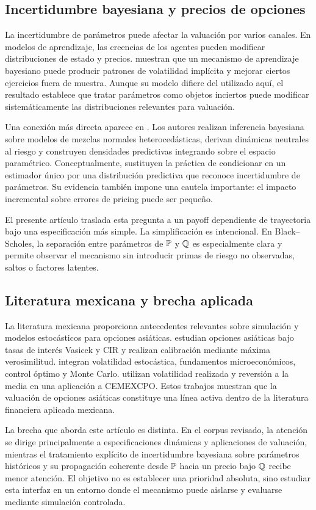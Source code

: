 \subsection{Incertidumbre bayesiana y precios de opciones}

La incertidumbre de parámetros puede afectar la valuación por varios canales. En modelos de aprendizaje, las creencias de los agentes pueden modificar distribuciones de estado y precios. \citet{guidolin2003} muestran que un mecanismo de aprendizaje bayesiano puede producir patrones de volatilidad implícita y mejorar ciertos ejercicios fuera de muestra. Aunque su modelo difiere del utilizado aquí, el resultado establece que tratar parámetros como objetos inciertos puede modificar sistemáticamente las distribuciones relevantes para valuación.

Una conexión más directa aparece en \citet{romboutsstentoft2014}. Los autores realizan inferencia bayesiana sobre modelos de mezclas normales heterocedásticas, derivan dinámicas neutrales al riesgo y construyen densidades predictivas integrando sobre el espacio paramétrico. Conceptualmente, sustituyen la práctica de condicionar en un estimador único por una distribución predictiva que reconoce incertidumbre de parámetros. Su evidencia también impone una cautela importante: el impacto incremental sobre errores de pricing puede ser pequeño.

El presente artículo traslada esta pregunta a un payoff dependiente de trayectoria bajo una especificación más simple. La simplificación es intencional. En Black--Scholes, la separación entre parámetros de $\mathbb{P}$ y $\mathbb{Q}$ es especialmente clara y permite observar el mecanismo sin introducir primas de riesgo no observadas, saltos o factores latentes.

\subsection{Literatura mexicana y brecha aplicada}

La literatura mexicana proporciona antecedentes relevantes sobre simulación y modelos estocásticos para opciones asiáticas. \citet{ortiz2016} estudian opciones asiáticas bajo tasas de interés Vasicek y CIR y realizan calibración mediante máxima verosimilitud. \citet{matias2019} integran volatilidad estocástica, fundamentos microeconómicos, control óptimo y Monte Carlo. \citet{ortizjimenez2026} utilizan volatilidad realizada y reversión a la media en una aplicación a CEMEXCPO. Estos trabajos muestran que la valuación de opciones asiáticas constituye una línea activa dentro de la literatura financiera aplicada mexicana.

La brecha que aborda este artículo es distinta. En el corpus revisado, la atención se dirige principalmente a especificaciones dinámicas y aplicaciones de valuación, mientras el tratamiento explícito de incertidumbre bayesiana sobre parámetros históricos y su propagación coherente desde $\mathbb{P}$ hacia un precio bajo $\mathbb{Q}$ recibe menor atención. El objetivo no es establecer una prioridad absoluta, sino estudiar esta interfaz en un entorno donde el mecanismo puede aislarse y evaluarse mediante simulación controlada.
